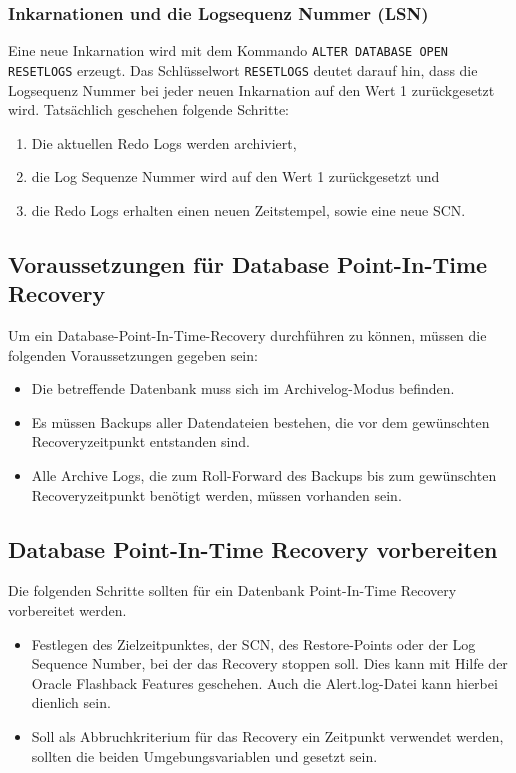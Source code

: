         \subsubsection{Inkarnationen und die Logsequenz Nummer (LSN)}
          Eine neue Inkarnation wird mit dem Kommando \lstinline[language=oracle_sql]{ALTER DATABASE OPEN RESETLOGS} erzeugt. Das Schl\"usselwort \lstinline[language=oracle_sql]{RESETLOGS} deutet darauf hin, dass die Logsequenz Nummer bei jeder neuen Inkarnation auf den Wert 1 zur\"uckgesetzt wird. Tats\"achlich geschehen folgende Schritte:
          \begin{enumerate}
            \item Die aktuellen Redo Logs werden archiviert,
            \item die Log Sequenze Nummer wird auf den Wert 1 zur\"uckgesetzt und
            \item die Redo Logs erhalten einen neuen Zeitstempel, sowie eine neue SCN.
          \end{enumerate}
      \subsection{Voraussetzungen f\"ur Database Point-In-Time Recovery}
        Um ein Database-Point-In-Time-Recovery durchf\"uhren zu k\"onnen, m\"ussen die folgenden Voraussetzungen gegeben sein:
        \begin{itemize}
          \item Die betreffende Datenbank muss sich im Archivelog-Modus befinden.
          \item Es m\"ussen Backups aller Datendateien bestehen, die vor dem gew\"unschten Reco\-very\-zeit\-punkt entstanden sind.
          \item Alle Archive Logs, die zum Roll-Forward des Backups bis zum gew\"unschten Reco\-very\-zeit\-punkt ben\"otigt werden, m\"ussen vorhanden sein.
        \end{itemize}
      \subsection{Database Point-In-Time Recovery vorbereiten}
        Die folgenden Schritte sollten f\"ur ein Datenbank Point-In-Time Recovery vorbereitet werden.
        \begin{itemize}
          \item Festlegen des Zielzeitpunktes, der SCN, des Restore-Points oder der Log Sequence Number, bei der das Recovery stoppen soll. Dies kann mit Hilfe der Oracle Flashback Features geschehen. Auch die Alert.log-Datei kann hierbei dienlich sein.
          \item Soll als Abbruchkriterium f\"ur das Recovery ein Zeitpunkt verwendet werden, sollten die beiden Umgebungsvariablen  und  gesetzt sein.
        \end{itemize}
